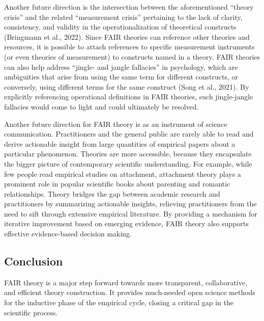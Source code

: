 \documentclass[
  man, noextraspace,floatsintext]{apa7}
\begin{document}
\label{measurementcrisis}{Another future direction is the intersection between the aforementioned ``theory crisis'' and the related ``measurement crisis'' pertaining to the lack of clarity, consistency, and validity in the operationalization of theoretical constructs (Bringmann et al., 2022).
Since FAIR theories can reference other theories and resources,
it is possible to attach references to specific measurement instruments (or even theories of measurement) to constructs named in a theory.}
\label{jinglejangle}{FAIR theories can also help address ``jingle- and jangle fallacies'' in psychology,
which are ambiguities that arise from using the same term for different constructs, or conversely, using different terms for the same construct (Song et al., 2021).
By explicitly referencing operational definitions in FAIR theories,
such jingle-jangle fallacies would come to light and could ultimately be resolved.}

Another future direction for FAIR theory is as an instrument of science communication. Practitioners and the general public are rarely able to read and derive actionable insight from large quantities of empirical papers about a particular phenomenon.
Theories are more accessible, because they encapsulate the bigger picture of contemporary scientific understanding.
For example, while few people read empirical studies on attachment,
attachment theory plays a prominent role in popular scientific books about parenting and romantic relationships.
Theory bridges the gap between academic research and practitioners by summarizing actionable insights, relieving practitioners from the need to sift through extensive empirical literature.
By providing a mechanism for iterative improvement based on emerging evidence, FAIR theory also supports effective evidence-based decision making.

\subsection{Conclusion}\label{conclusion}

FAIR theory is a major step forward towards more transparent, collaborative, and efficient theory construction.
It provides much-needed open science methods for the inductive phase of the empirical cycle,
closing a critical gap in the scientific process.
\end{document}
